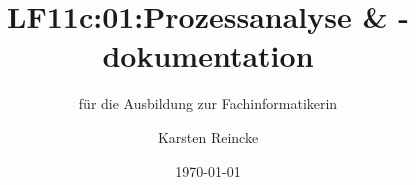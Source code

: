 \documentclass[]{beamer}
\title{LF11c:01:Prozessanalyse \& -dokumentation}
\subtitle{für die Ausbildung zur Fachinformatikerin}
\institute[GS-LDK]{Gewerbliche Schulen Dillenburg}
\author{Karsten Reincke}
\date{\today}
\def\cfgGl{../../../cfg.gl/}
\begin{document}

\begin{frame}
  \titlepage

  
\end{frame}






\logo{}
\newpage



%
\end{document}
